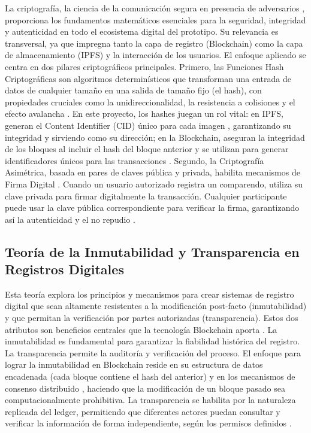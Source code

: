 La criptografía, la ciencia de la comunicación segura en presencia de adversarios \parencite{katz2020introduction}, proporciona los fundamentos matemáticos esenciales para la seguridad, integridad y autenticidad en todo el ecosistema digital del prototipo. Su relevancia es transversal, ya que impregna tanto la capa de registro (Blockchain) como la capa de almacenamiento (IPFS) y la interacción de los usuarios. El enfoque aplicado se centra en dos pilares criptográficos principales. Primero, las Funciones Hash Criptográficas son algoritmos determinísticos que transforman una entrada de datos de cualquier tamaño en una salida de tamaño fijo (el hash), con propiedades cruciales como la unidireccionalidad, la resistencia a colisiones y el efecto avalancha \parencite{schneier2007applied,katz2020introduction}. En este proyecto, los hashes juegan un rol vital: en IPFS, generan el Content Identifier (CID) único para cada imagen \parencite{benet2014ipfs}, garantizando su integridad y sirviendo como su dirección; en la Blockchain, aseguran la integridad de los bloques al incluir el hash del bloque anterior y se utilizan para generar identificadores únicos para las transacciones \parencite{nakamoto2008bitcoin}. Segundo, la Criptografía Asimétrica, basada en pares de claves pública y privada, habilita mecanismos de Firma Digital \parencite{diffie2022new,rivest1978method}. Cuando un usuario autorizado registra un comparendo, utiliza su clave privada para firmar digitalmente la transacción. Cualquier participante puede usar la clave pública correspondiente para verificar la firma, garantizando así la autenticidad y el no repudio \parencite{katz2020introduction}. 

 

\subsection{Teoría de la Inmutabilidad y Transparencia en Registros Digitales} 

Esta teoría explora los principios y mecanismos para crear sistemas de registro digital que sean altamente resistentes a la modificación post-facto (inmutabilidad) y que permitan la verificación por partes autorizadas (transparencia). Estos dos atributos son beneficios centrales que la tecnología Blockchain aporta \parencite{swan2015blockchain,antonopoulos2023mastering}. La inmutabilidad es fundamental para garantizar la fiabilidad histórica del registro. La transparencia permite la auditoría y verificación del proceso. El enfoque para lograr la inmutabilidad en Blockchain reside en su estructura de datos encadenada (cada bloque contiene el hash del anterior) y en los mecanismos de consenso distribuido \parencite{nakamoto2008bitcoin}, haciendo que la modificación de un bloque pasado sea computacionalmente prohibitiva. La transparencia se habilita por la naturaleza replicada del ledger, permitiendo que diferentes actores puedan consultar y verificar la información de forma independiente, según los permisos definidos \parencite{antonopoulos2023mastering}. 

